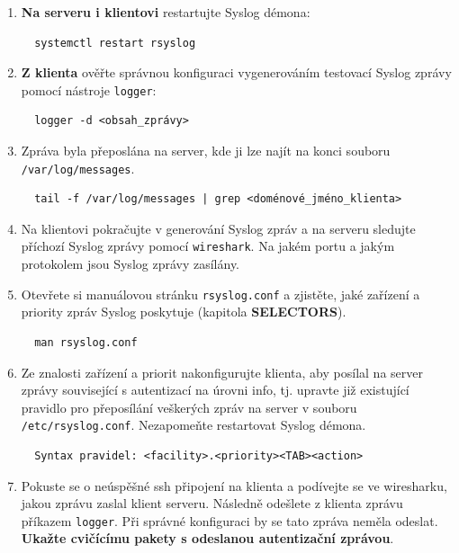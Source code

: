 \begin{itemize}
\begin{enumerate}
            \item {\bf Na serveru i klientovi} restartujte Syslog démona: 
\begin{verbatim}
  systemctl restart rsyslog
\end{verbatim} 

            \item {\bf Z klienta} ověřte správnou konfiguraci vygenerováním testovací Syslog 
         zprávy pomocí nástroje {\tt logger}:
\begin{verbatim} 
  logger -d <obsah_zprávy>
\end{verbatim} 
        
            \item Zpráva byla přeposlána na server, kde ji lze najít na konci souboru
         {\tt /var/log/messages}.

\begin{verbatim} 
  tail -f /var/log/messages | grep <doménové_jméno_klienta>
\end{verbatim} 

            \item  Na klientovi pokračujte v generování Syslog zpráv a 
         na serveru sledujte příchozí Syslog zprávy pomocí {\tt wireshark}. Na jakém
         portu a jakým protokolem jsou Syslog zprávy zasílány.      

            \item Otevřete si manuálovou stránku {\tt rsyslog.conf} a zjistěte, jaké zařízení a priority
         zpráv Syslog poskytuje (kapitola {\bf SELECTORS}). 
\begin{verbatim} 
  man rsyslog.conf
\end{verbatim} 
        
         \item Ze znalosti zařízení a priorit nakonfigurujte klienta, aby posílal na server 
         zprávy související s autentizací na úrovni info, tj. upravte již existující pravidlo pro přeposílání
         veškerých zpráv na server v souboru {\tt /etc/rsyslog.conf}. Nezapomeňte restartovat Syslog démona. 
         
\begin{verbatim} 
  Syntax pravidel: <facility>.<priority><TAB><action>
\end{verbatim} 
         \item Pokuste se o neúspěšné ssh připojení na klienta a podívejte se ve wiresharku, jakou zprávu zaslal klient serveru. Následně odešlete z klienta zprávu příkazem {\tt logger}. Při správné konfiguraci by se tato zpráva neměla odeslat. {\bf Ukažte cvičícímu pakety s odeslanou autentizační zprávou}.

       \end{enumerate}
   \end{itemize}

